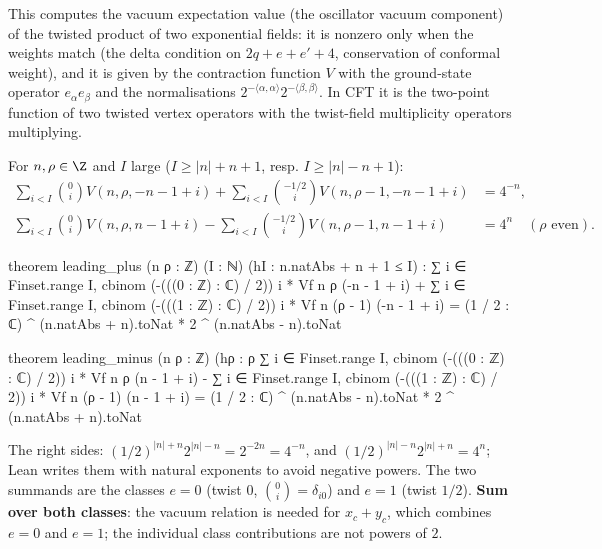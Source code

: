 \begin{physics}
This computes the vacuum expectation value (the oscillator vacuum component) of the twisted product of two exponential fields: it is nonzero only when the weights match (the delta condition on $2q+e+e'+4$, conservation of conformal weight), and it is given by the contraction function $V$ with the ground-state operator $e_\alpha e_\beta$ and the normalisations $2^{-\langle\alpha,\alpha\rangle}2^{-\langle\beta,\beta\rangle}$. In CFT it is the two-point function of two twisted vertex operators with the twist-field multiplicity operators multiplying.
\end{physics}

\begin{theorem}\label{ch08:thm:leading}
For $n,\rho\in\Z$ and $I$ large ($I\ge|n|+n+1$, resp. $I\ge|n|-n+1$):
\begin{align*}
  \sum_{i<I}\binom{0}{i}V(n,\rho,-n-1+i)+\sum_{i<I}\binom{-1/2}{i}V(n,\rho-1,-n-1+i)&=4^{-n},\\
  \sum_{i<I}\binom{0}{i}V(n,\rho,n-1+i)-\sum_{i<I}\binom{-1/2}{i}V(n,\rho-1,n-1+i)&=4^{n}\quad(\rho\text{ even}).
\end{align*}
\end{theorem}
\begin{leancode}
theorem leading_plus (n ρ : ℤ) (I : ℕ) (hI : n.natAbs + n + 1 ≤ I) :
    ∑ i ∈ Finset.range I, cbinom (-(((0 : ℤ) : ℂ) / 2)) i * Vf n ρ (-n - 1 + i)
      + ∑ i ∈ Finset.range I, cbinom (-(((1 : ℤ) : ℂ) / 2)) i * Vf n (ρ - 1) (-n - 1 + i)
      = (1 / 2 : ℂ) ^ (n.natAbs + n).toNat * 2 ^ (n.natAbs - n).toNat

theorem leading_minus (n ρ : ℤ) (hρ : ρ %
    ∑ i ∈ Finset.range I, cbinom (-(((0 : ℤ) : ℂ) / 2)) i * Vf n ρ (n - 1 + i)
      - ∑ i ∈ Finset.range I, cbinom (-(((1 : ℤ) : ℂ) / 2)) i * Vf n (ρ - 1) (n - 1 + i)
      = (1 / 2 : ℂ) ^ (n.natAbs - n).toNat * 2 ^ (n.natAbs + n).toNat
\end{leancode}
\begin{dictionary}
The right sides: $(1/2)^{|n|+n}2^{|n|-n}=2^{-2n}=4^{-n}$, and
$(1/2)^{|n|-n}2^{|n|+n}=4^{n}$; Lean writes them with natural exponents to avoid negative powers.
The two summands are the classes $e=0$ (twist $0$, $\binom{0}{i}=\delta_{i0}$) and $e=1$ (twist
$1/2$).  \textbf{Sum over both classes}: the vacuum relation is needed for $x_c+y_c$, which
combines $e=0$ and $e=1$; the individual class contributions are not powers of $2$.
\end{dictionary}

